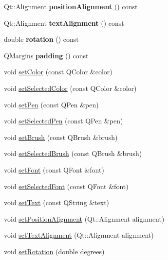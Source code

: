 \begin{DoxyCompactItemize}
Qt\+::\+Alignment {\bfseries position\+Alignment} () const
\item 
\mbox{\label{class_q_c_p_item_text_a9af3198d46551e1cc7703f02c95ddfe5}} 
Qt\+::\+Alignment {\bfseries text\+Alignment} () const
\item 
\mbox{\label{class_q_c_p_item_text_a035962b4ed23ff0a89e6a8b46fa18bf1}} 
double {\bfseries rotation} () const
\item 
\mbox{\label{class_q_c_p_item_text_a5a598618350b40446d031fa9dc15fba7}} 
Q\+Margins {\bfseries padding} () const
\item 
void \hyperlink{class_q_c_p_item_text_aa51efc0841fe52da9eaf8aff6fc8a8b2}{set\+Color} (const Q\+Color \&color)
\item 
void \hyperlink{class_q_c_p_item_text_ae7ba0bdb75c897b028388e45bfd435fa}{set\+Selected\+Color} (const Q\+Color \&color)
\item 
void \hyperlink{class_q_c_p_item_text_a9b9ec6eea0eb0603977ff84d4c78d0a3}{set\+Pen} (const Q\+Pen \&pen)
\item 
void \hyperlink{class_q_c_p_item_text_a291febe586f0da3f1c392e77bef4aa20}{set\+Selected\+Pen} (const Q\+Pen \&pen)
\item 
void \hyperlink{class_q_c_p_item_text_a1c7e131516df2ed8d941ef31240ded8e}{set\+Brush} (const Q\+Brush \&brush)
\item 
void \hyperlink{class_q_c_p_item_text_a6b8377eeb2af75eb9528422671ac16cb}{set\+Selected\+Brush} (const Q\+Brush \&brush)
\item 
void \hyperlink{class_q_c_p_item_text_a94ad60ebe04f5c07c35e7c2029e96b1f}{set\+Font} (const Q\+Font \&font)
\item 
void \hyperlink{class_q_c_p_item_text_a0be2841772f83663c4db307928b82816}{set\+Selected\+Font} (const Q\+Font \&font)
\item 
void \hyperlink{class_q_c_p_item_text_a3dacdda0ac88f99a05b333b977c48747}{set\+Text} (const Q\+String \&text)
\item 
void \hyperlink{class_q_c_p_item_text_a781cdf8c640fc6a055dcff1e675c8c7a}{set\+Position\+Alignment} (Qt\+::\+Alignment alignment)
\item 
void \hyperlink{class_q_c_p_item_text_ab5bc0684c4d1bed81949a11b34dba478}{set\+Text\+Alignment} (Qt\+::\+Alignment alignment)
\item 
void \hyperlink{class_q_c_p_item_text_a4bcc10cd97952c3f749d75824b5077f0}{set\+Rotation} (double degrees)

\end{DoxyCompactItemize}
